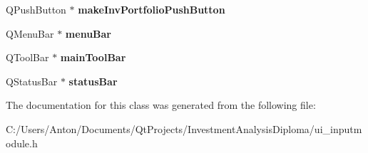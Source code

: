 \begin{DoxyCompactItemize}
\item 
\hypertarget{class_ui___input_module_a93740b54a6ed32b9a557270b49fc1079}{}Q\+Push\+Button $\ast$ {\bfseries make\+Inv\+Portfolio\+Push\+Button}\label{class_ui___input_module_a93740b54a6ed32b9a557270b49fc1079}

\item 
\hypertarget{class_ui___input_module_a5a72ab2ec61ba8000f838fa3ea5ba025}{}Q\+Menu\+Bar $\ast$ {\bfseries menu\+Bar}\label{class_ui___input_module_a5a72ab2ec61ba8000f838fa3ea5ba025}

\item 
\hypertarget{class_ui___input_module_abdf49f2ac11237a06a7df43b7b0d371a}{}Q\+Tool\+Bar $\ast$ {\bfseries main\+Tool\+Bar}\label{class_ui___input_module_abdf49f2ac11237a06a7df43b7b0d371a}

\item 
\hypertarget{class_ui___input_module_a2a340d851d9ea55f810e9244883ac6e2}{}Q\+Status\+Bar $\ast$ {\bfseries status\+Bar}\label{class_ui___input_module_a2a340d851d9ea55f810e9244883ac6e2}

\end{DoxyCompactItemize}


The documentation for this class was generated from the following file\+:\begin{DoxyCompactItemize}
\item 
C\+:/\+Users/\+Anton/\+Documents/\+Qt\+Projects/\+Investment\+Analysis\+Diploma/ui\+\_\+inputmodule.\+h\end{DoxyCompactItemize}
